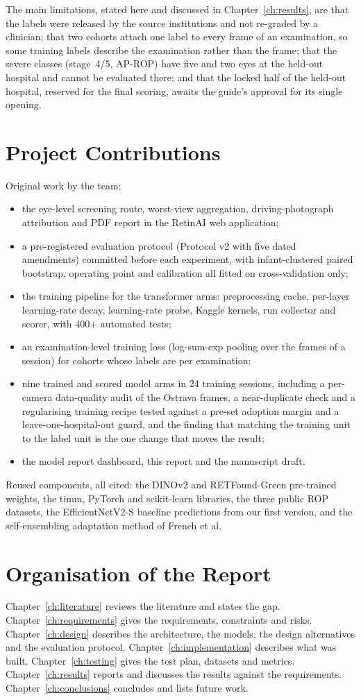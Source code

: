 The main limitations, stated here and discussed in Chapter~\ref{ch:results}, are that the labels were released by the source institutions and not re-graded by a clinician; that two cohorts attach one label to every frame of an examination, so some training labels describe the examination rather than the frame; that the severe classes (stage~4/5, AP-ROP) have five and two eyes at the held-out hospital and cannot be evaluated there; and that the locked half of the held-out hospital, reserved for the final scoring, awaits the guide's approval for its single opening.

\section{Project Contributions}
Original work by the team:
\begin{itemize}
\item the eye-level screening route, worst-view aggregation, driving-photograph attribution and PDF report in the RetinAI web application;
\item a pre-registered evaluation protocol (Protocol v2 with five dated amendments) committed before each experiment, with infant-clustered paired bootstrap, operating point and calibration all fitted on cross-validation only;
\item the training pipeline for the transformer arms: preprocessing cache, per-layer learning-rate decay, learning-rate probe, Kaggle kernels, run collector and scorer, with 400+ automated tests;
\item an examination-level training loss (log-sum-exp pooling over the frames of a session) for cohorts whose labels are per examination;
\item nine trained and scored model arms in 24 training sessions, including a per-camera data-quality audit of the Ostrava frames, a near-duplicate check and a regularising training recipe tested against a pre-set adoption margin and a leave-one-hospital-out guard, and the finding that matching the training unit to the label unit is the one change that moves the result;
\item the model report dashboard, this report and the manuscript draft.
\end{itemize}
Reused components, all cited: the DINOv2 and RETFound-Green pre-trained weights, the timm, PyTorch and scikit-learn libraries, the three public ROP datasets, the EfficientNetV2-S baseline predictions from our first version, and the self-ensembling adaptation method of French et al.

\section{Organisation of the Report}
Chapter~\ref{ch:literature} reviews the literature and states the gap. Chapter~\ref{ch:requirements} gives the requirements, constraints and risks. Chapter~\ref{ch:design} describes the architecture, the models, the design alternatives and the evaluation protocol. Chapter~\ref{ch:implementation} describes what was built. Chapter~\ref{ch:testing} gives the test plan, datasets and metrics. Chapter~\ref{ch:results} reports and discusses the results against the requirements. Chapter~\ref{ch:conclusions} concludes and lists future work.
